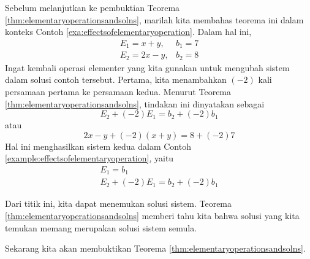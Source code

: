 Sebelum melanjutkan ke pembuktian Teorema \ref{thm:elementaryoperationsandsolns},
marilah kita membahas teorema ini dalam konteks Contoh \ref{exa:effectsofelementaryoperation}. Dalam hal ini,
\begin{equation*}
\begin{array}{cc}
E_{1} = x+y, & b_{1} = 7 \\
E_{2} = 2x-y, & b_{2} = 8 
\end{array}
\end{equation*}
Ingat kembali operasi elementer yang kita gunakan untuk mengubah sistem dalam solusi contoh tersebut.
Pertama, kita menambahkan $\left( -2 \right)$ kali persamaan pertama ke persamaan kedua.
Menurut Teorema \ref{thm:elementaryoperationsandsolns}, tindakan ini dinyatakan sebagai
\begin{equation*}
E_{2} + \left( -2 \right) E_{1} = b_{2} + \left( -2 \right)b_{1}
\end{equation*}
atau
\begin{equation*}
2x-y + \left( -2 \right) \left(x+y \right) = 8 + \left( -2 \right) 7
\end{equation*}
Hal ini menghasilkan sistem kedua dalam Contoh \ref{example:effectsofelementaryoperation}, yaitu
\begin{equation*}
\begin{array}{c}
E_{1} = b_{1} \\
E_{2} + \left( -2 \right) E_{1} = b_{2} + \left( -2 \right) b_{1}
\end{array}
\end{equation*}

Dari titik ini, kita dapat
menemukan solusi sistem. Teorema \ref{thm:elementaryoperationsandsolns} memberi tahu kita bahwa solusi yang
kita temukan memang merupakan solusi sistem semula.

\ifdefined\showproofs
Sekarang kita akan membuktikan Teorema \ref{thm:elementaryoperationsandsolns}.

